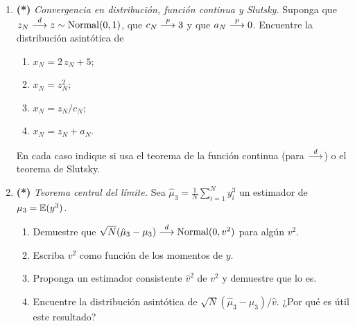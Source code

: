 \documentclass[letterpaper,11pt]{article}
\begin{document}
\begin{enumerate}[itemsep=1.2em]
\item \textbf{(*)} \emph{Convergencia en distribución, función continua y Slutsky.} Suponga que
    $z_N \stackrel{d}{\longrightarrow} z \sim \operatorname{Normal}(0,1)$, que $c_N \stackrel{p}{\longrightarrow} 3$ y que $a_N \stackrel{p}{\longrightarrow} 0$. Encuentre la distribución
    asintótica de
    \begin{enumerate}
        \item $x_N = 2\,z_N+5$;
        \item $x_N = z_N^2$;
        \item $x_N = z_N/c_N$;
        \item $x_N = z_N + a_N$.
    \end{enumerate}
    En cada caso indique si usa el teorema de la función continua (para $\stackrel{d}{\longrightarrow}$) o el teorema de
    Slutsky.

\item \textbf{(*)} \emph{Teorema central del límite.} Sea $\hat\mu_3=\frac{1}{N}\sum_{i=1}^N y_i^3$
    un estimador de $\mu_3=\operatorname{\mathbb{E}}(y^3)$.
    \begin{enumerate}
        \item Demuestre que $\sqrt{N}(\hat\mu_3-\mu_3)\stackrel{d}{\longrightarrow} \operatorname{Normal}(0,v^2)$ para algún $v^2$.
        \item Escriba $v^2$ como función de los momentos de $y$.
        \item Proponga un estimador consistente $\hat v^2$ de $v^2$ y demuestre que lo es.
        \item Encuentre la distribución asintótica de $\sqrt{N}(\hat\mu_3-\mu_3)/\hat v$.
              ¿Por qué es útil este resultado?
    \end{enumerate}


\end{enumerate}
\end{document}
